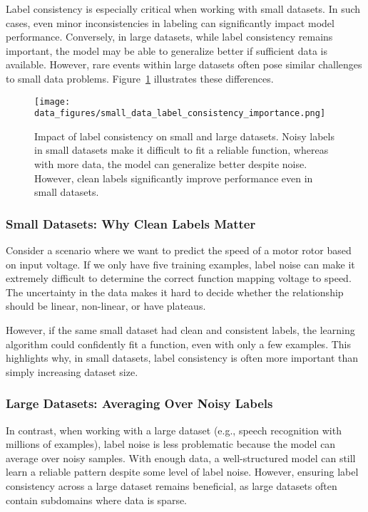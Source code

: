 \documentclass[12pt,openany, draft]{book}
\begin{document}
Label consistency is especially critical when working with small datasets. In such cases, even minor inconsistencies in labeling can significantly impact model performance. Conversely, in large datasets, while label consistency remains important, the model may be able to generalize better if sufficient data is available. However, rare events within large datasets often pose similar challenges to small data problems. Figure~\ref{fig:small_data_label_consistency_importance} illustrates these differences.

\begin{figure}[H]
    \centering
    \texttt{[image: data\_figures/small\_data\_label\_consistency\_importance.png]}
    \caption{Impact of label consistency on small and large datasets. Noisy labels in small datasets make it difficult to fit a reliable function, whereas with more data, the model can generalize better despite noise. However, clean labels significantly improve performance even in small datasets.}
    \label{fig:small_data_label_consistency_importance}
\end{figure}

\subsubsection{Small Datasets: Why Clean Labels Matter}
Consider a scenario where we want to predict the speed of a motor rotor based on input voltage. If we only have five training examples, label noise can make it extremely difficult to determine the correct function mapping voltage to speed. The uncertainty in the data makes it hard to decide whether the relationship should be linear, non-linear, or have plateaus. \newline

However, if the same small dataset had clean and consistent labels, the learning algorithm could confidently fit a function, even with only a few examples. This highlights why, in small datasets, label consistency is often more important than simply increasing dataset size.

\subsubsection{Large Datasets: Averaging Over Noisy Labels}
In contrast, when working with a large dataset (e.g., speech recognition with millions of examples), label noise is less problematic because the model can average over noisy samples. With enough data, a well-structured model can still learn a reliable pattern despite some level of label noise. However, ensuring label consistency across a large dataset remains beneficial, as large datasets often contain subdomains where data is sparse.
\end{document}
